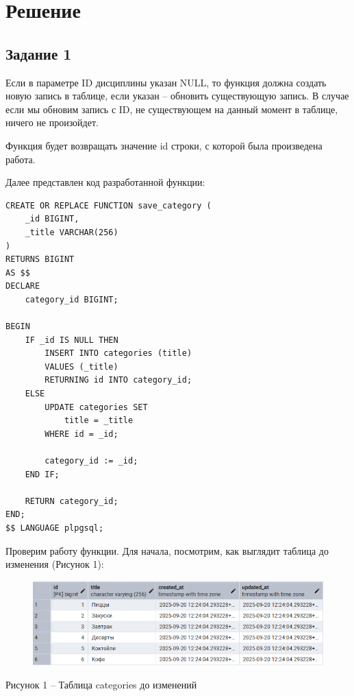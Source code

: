 \documentclass[a4paper,14pt]{extarticle}
\begin{document}
  \pagebreak
  \section*{Решение}
  \subsection*{Задание 1}

  Если в параметре ID дисциплины указан NULL, то функция должна создать новую запись в таблице, если указан – обновить существующую запись. В случае если мы обновим запись с ID, не существующем на данный момент в таблице, ничего не произойдет.

  Функция будет возвращать значение id строки, с которой была произведена работа.

  Далее представлен код разработанной функции:

  \noindent
  \begin{Verbatim}[tabsize=4,fontsize=\small]
CREATE OR REPLACE FUNCTION save_category (
    _id BIGINT,
    _title VARCHAR(256)
)
RETURNS BIGINT
AS $$
DECLARE
    category_id BIGINT;

BEGIN
    IF _id IS NULL THEN
        INSERT INTO categories (title)
        VALUES (_title)
        RETURNING id INTO category_id;
    ELSE
        UPDATE categories SET
            title = _title
        WHERE id = _id;

        category_id := _id;
    END IF;

    RETURN category_id;
END;
$$ LANGUAGE plpgsql;
  \end{Verbatim}

  Проверим работу функции. Для начала, посмотрим, как выглядит таблица до изменения (Рисунок 1):

  \begin{figure}[h]
    \centering
    \includegraphics[width=1\linewidth]{img/t-1-1}
  \end{figure}
  \begin{center}
    Рисунок 1 – Таблица categories до изменений
  \end{center}
\end{document}
